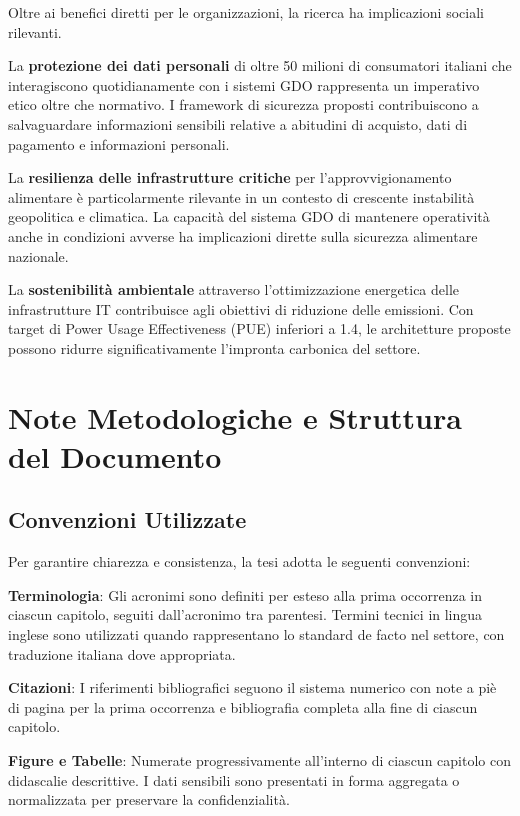 \begin{bibunit}[IEEEtran]
Oltre ai benefici diretti per le organizzazioni, la ricerca ha implicazioni sociali rilevanti.

La \textbf{protezione dei dati personali} di oltre 50 milioni di consumatori italiani che interagiscono quotidianamente con i sistemi GDO rappresenta un imperativo etico oltre che normativo. I framework di sicurezza proposti contribuiscono a salvaguardare informazioni sensibili relative a abitudini di acquisto, dati di pagamento e informazioni personali.

La \textbf{resilienza delle infrastrutture critiche} per l'approvvigionamento alimentare è particolarmente rilevante in un contesto di crescente instabilità geopolitica e climatica. La capacità del sistema GDO di mantenere operatività anche in condizioni avverse ha implicazioni dirette sulla sicurezza alimentare nazionale.

La \textbf{sostenibilità ambientale} attraverso l'ottimizzazione energetica delle infrastrutture IT contribuisce agli obiettivi di riduzione delle emissioni. Con target di Power Usage Effectiveness (PUE) inferiori a 1.4, le architetture proposte possono ridurre significativamente l'impronta carbonica del settore.

\section{Note Metodologiche e Struttura del Documento}

\subsection{Convenzioni Utilizzate}

Per garantire chiarezza e consistenza, la tesi adotta le seguenti convenzioni:

\textbf{Terminologia}: Gli acronimi sono definiti per esteso alla prima occorrenza in ciascun capitolo, seguiti dall'acronimo tra parentesi. Termini tecnici in lingua inglese sono utilizzati quando rappresentano lo standard de facto nel settore, con traduzione italiana dove appropriata.

\textbf{Citazioni}: I riferimenti bibliografici seguono il sistema numerico con note a piè di pagina per la prima occorrenza e bibliografia completa alla fine di ciascun capitolo.

\textbf{Figure e Tabelle}: Numerate progressivamente all'interno di ciascun capitolo con didascalie descrittive. I dati sensibili sono presentati in forma aggregata o normalizzata per preservare la confidenzialità.


\end{bibunit}
